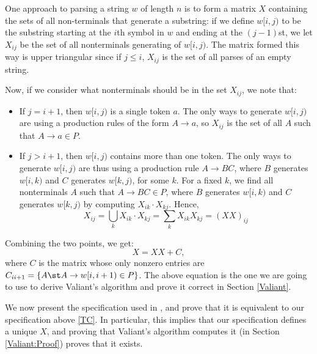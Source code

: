 One approach to parsing a string $w$ of length $n$ is to form a matrix $X$ containing the sets of all non-terminals that generate a substring: if we define $w[i,j)$ to be the substring starting at the $i$th symbol in $w$ and ending at the $(j-1)$st, we let $X_{i j}$ be the set of all nonterminals generating of $w[i,j)$. The matrix formed this way is upper triangular since if $j \le i$, $X_{i j}$ is the set of all parses of an empty string.

Now, if we consider what nonterminals should be in the set $X_{i j}$, we note that:
\begin{itemize}
\item If $j = i + 1$, then $w[i,j)$ is a single token $a$. The only ways to generate $w[i,j)$ are using a production rules of the form $A \to a$, so $X_{i j}$ is the set of all $A$ such that $A \to a \in P$.
\item If $j > i + 1$, then $w[i,j)$ contains more than one token. The only ways to generate $w[i,j)$ are thus using a production rule $A \to BC$, where $B$ generates $w[i,k)$ and $C$ generates $w[k,j)$, for some $k$. For a fixed $k$, we find all nonterminals $A$ such that $A \to BC \in P$, where $B$ generates $w[i,k)$ and $C$ generates $w[k,j)$ by computing $X_{i k} \cdot X_{k j}$. Hence, 
            \begin{equation}
              X_{i j} = \bigcup_k X_{i k}\cdot X_{k j} = \sum_kX_{i k}X_{k j} = (XX)_{i j}
            \end{equation}
\end{itemize}
Combining the two points, we get:
\begin{equation}
  \label{TC}
  X = XX + C,
\end{equation}
where $C$ is the matrix whose only nonzero entries are $C_{i i+1} = \{A \st A \to w[i,i+1) \in P\}$. The above equation is the one we are going to use to derive Valiant's algorithm and prove it correct in Section \ref{Valiant}. 




\label{Valiant's-spec}
We now present the specification used in \citep{Valiant}, and prove that it is equivalent to our specification above \eqref{TC}. In particular, this implies that our specification defines a unique $X$, and proving that Valiant's algorithm computes it (in Section \ref{Valiant:Proof}) proves that it exists.

